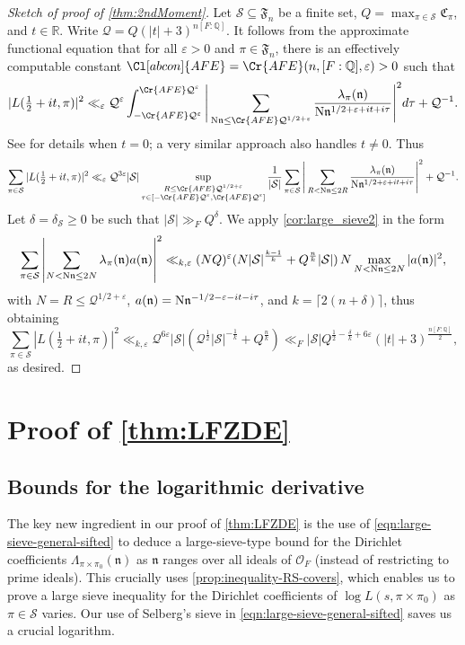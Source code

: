 \documentclass[11pt]{amsart}
\theoremstyle{remark}
\numberwithin{equation}{section}
\newcommand{\kn}{\mathfrak{n}}
\newcommand{\F}{\mathfrak{F}}
\newcommand{\N}{\textnormal{N}}
\newcommand{\R}{\mathbb{R}}
\newcommand{\Q}{\mathbb{Q}}
\newcommand{\mS}{\mathcal{S}}
\renewcommand{\epsilon}{\varepsilon}
\begin{document}
\begin{proof}[Sketch of proof of \cref{thm:2ndMoment}]
Let $\mathcal{S}\subseteq\mathfrak{F}_n$ be a finite set, $Q=\max_{\pi\in\mathcal{S}}\mathfrak{C}_{\pi}$, and $t\in\R$.  Write $\mathcal{Q}=Q(|t|+3)^{n[F:\Q]}$.  It follows from the approximate functional equation \cite{HarcosAFE1,HarcosAFE2} that for all $\epsilon>0$ and $\pi \in \F_n$, there is an effectively computable constant $\Cl[abcon]{AFE}=\Cr{AFE}(n,[F:\Q],\epsilon)>0$ such that
\[
|L(\tfrac{1}{2}+it,\pi)|^2 \ll_{\epsilon}\mathcal{Q}^{\epsilon}\int_{-\Cr{AFE}\mathcal{Q}^{\epsilon}}^{\Cr{AFE}\mathcal{Q}^{\epsilon}}\Bigg|\sum_{\N\kn\leq \Cr{AFE} \mathcal{Q}^{1/2+\epsilon}}\frac{\lambda_{\pi}(\kn)}{\N\kn^{1/2+\epsilon+it+i\tau}}\Bigg|^2 d\tau+\mathcal{Q}^{-1}.
\]
See \cite[Lemma 3.4]{jana2020applications} for details when $t=0$; a very similar approach also handles $t\neq 0$. Thus
\[
\sum_{\pi\in\mathcal{S}}|L(\tfrac{1}{2}+it,\pi)|^2\ll_{\epsilon} \mathcal{Q}^{3\epsilon}|\mathcal{S}|\sup_{\substack{R\leq \Cr{AFE}\mathcal{Q}^{1/2+\epsilon} \\ \tau\in[-\Cr{AFE}\mathcal{Q}^{\epsilon},\Cr{AFE}\mathcal{Q}^{\epsilon}]}}\frac{1}{|\mathcal{S}|}\sum_{\pi\in\mathcal{S}}\Bigg|\sum_{R<\N\kn\leq 2R}\frac{\lambda_{\pi}(\kn)}{\N\kn^{1/2+\epsilon+it+i\tau}}\Bigg|^2+\mathcal{Q}^{-1}.
\]
Let $\delta=\delta_{\mathcal{S}}\geq 0$ be such that $|\mathcal{S}|\gg_{F}Q^{\delta}$.  We apply \cref{cor:large_sieve2} in the form 
\[
    \sum_{\pi \in \mS} \left\vert \sum_{N < \N\kn \le 2N} \lambda_\pi(\kn) a(\kn) \right\vert^2 \ll_{k,\epsilon} (NQ)^{\epsilon} (N|\mS|^{\frac{k-1}{k}} + Q^{\frac{n}{k}} |\mS|)\, N\max_{N<\N\kn \le 2N} |a(\kn)|^2,
\]
with $N=R\leq \mathcal{Q}^{1/2+\epsilon}$, $a(\kn)=\N\kn^{-1/2-\epsilon-it-i\tau}$, and $k=\lceil 2(n+\delta)\rceil$, thus obtaining
\[
\sum_{\pi\in\mathcal{S}}|L(\tfrac{1}{2}+it,\pi)|^2 \ll_{k,\epsilon} 
\mathcal{Q}^{6\epsilon}|\mathcal{S}|(\mathcal{Q}^{\frac{1}{2}}|\mathcal{S}|^{-\frac{1}{k}}+Q^{\frac{n}{k}})\ll_F |\mathcal{S}| Q^{\frac{1}{2}-\frac{\delta}{k}+6\epsilon}(|t|+3)^{\frac{n[F:\Q]}{2}},
\]
as desired.
\end{proof}

\section{Proof of \cref{thm:LFZDE}}
\label{sec:LFZDE}

\subsection{Bounds for the logarithmic derivative}
The key new ingredient in our proof of \cref{thm:LFZDE} is the use of \eqref{eqn:large-sieve-general-sifted} to deduce a large-sieve-type bound for the Dirichlet coefficients $\Lambda_{\pi\times\pi_0}(\kn)$ as $\kn$ ranges over all ideals of $\mathcal{O}_F$ (instead of restricting to prime ideals).  This crucially uses \cref{prop:inequality-RS-covers}, which enables us to prove a large sieve inequality for the Dirichlet coefficients of $\log L(s,\pi\times\pi_0)$ as $\pi\in\mathcal{S}$ varies.  Our use of Selberg's sieve in \eqref{eqn:large-sieve-general-sifted} saves us a crucial logarithm.
\end{document}
